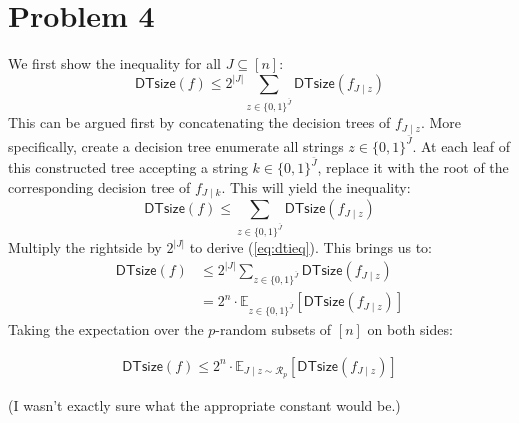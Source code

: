 \documentclass[12pt]{article}%
\newcommand{\Exp}[1]{\mathbb{E}_{#1}}
\begin{document}
\section*{Problem 4}
We first show the inequality for all $J \subseteq [n]$:
\begin{equation} \label{eq:dtieq}
  \mathsf{DTsize}(f) \leq 2^{|J|} \sum_{z \in \{0,1\}^{\bar{J}}} \mathsf{DTsize}(f_{J\mid z})
\end{equation}
%
This can be argued first by concatenating the decision trees of $f_{J\mid z}$. More specifically, create a decision tree enumerate all strings $z \in \{0,1\}^{\bar{J}}$. At each leaf of this constructed tree accepting a string $k \in \{0,1\}^{\bar{J}}$, replace it with the root of the corresponding decision tree of $f_{J\mid k}$. This will yield the inequality:
\[ \mathsf{DTsize}(f) \leq \sum_{z \in \{0,1\}^{\bar{J}}} \mathsf{DTsize}(f_{J\mid z})\]
Multiply the rightside by $ 2^{|J|}$ to derive (\ref{eq:dtieq}). This brings us to:
\begin{align*}
  \mathsf{DTsize}(f) & \leq 2^{|J|} \sum_{z \in \{0,1\}^{\bar{J}}} \mathsf{DTsize}(f_{J\mid z}) \\
  & = 2^{n} \cdot \Exp{z \in \{0,1\}^{\bar{J}}} \left[ \mathsf{DTsize}(f_{J\mid z}) \right]
\end{align*}
%
Taking the expectation over the $p$-random subsets of $[n]$ on both sides:

\begin{align*}
  \mathsf{DTsize}(f) \leq 2^n \cdot \Exp{J\mid z \sim \mathcal{R}_p} \left[ \mathsf{DTsize}(f_{J\mid z}) \right]
\end{align*}

(I wasn't exactly sure what the appropriate constant would be.)
\end{document}
